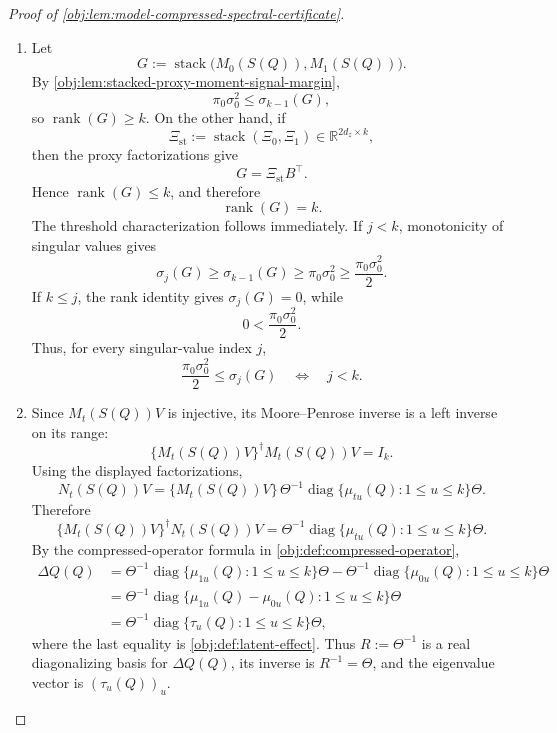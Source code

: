 \begin{proof}[Proof of \cref{obj:lem:model-compressed-spectral-certificate}]
\begin{enumerate}
\item
Let
\[
G:=\operatorname{stack}\bigl(M_0(S(Q)),M_1(S(Q))\bigr).
\]
By \cref{obj:lem:stacked-proxy-moment-signal-margin},
\[
\pi_0\sigma_0^2\le \sigma_{k-1}(G),
\]
so \(\operatorname{rank}(G)\ge k\).  On the other hand, if
\[
\Xi_{\mathrm{st}}:=\operatorname{stack}(\Xi_0,\Xi_1)\in\mathbb R^{2d_z\times k},
\]
then the proxy factorizations give
\[
G=\Xi_{\mathrm{st}}B^\top .
\]
Hence \(\operatorname{rank}(G)\le k\), and therefore
\[
\operatorname{rank}(G)=k .
\]
The threshold characterization follows immediately.  If \(j<k\), monotonicity of singular values gives
\[
\sigma_j(G)\ge\sigma_{k-1}(G)\ge\pi_0\sigma_0^2
\ge\frac{\pi_0\sigma_0^2}{2}.
\]
If \(k\le j\), the rank identity gives \(\sigma_j(G)=0\), while
\[
0<\frac{\pi_0\sigma_0^2}{2}.
\]
Thus, for every singular-value index \(j\),
\[
\frac{\pi_0\sigma_0^2}{2}\le \sigma_j(G)
\quad\Longleftrightarrow\quad
j<k .
\]

\item
Since \(M_t(S(Q))V\) is injective, its Moore--Penrose inverse is a left inverse on its range:
\[
\{M_t(S(Q))V\}^{\dagger}M_t(S(Q))V=I_k .
\]
Using the displayed factorizations,
\[
N_t(S(Q))V
=
\{M_t(S(Q))V\}\,
\Theta^{-1}\operatorname{diag}\{\mu_{tu}(Q):1\le u\le k\}\Theta .
\]
Therefore
\[
\{M_t(S(Q))V\}^{\dagger}N_t(S(Q))V
=
\Theta^{-1}\operatorname{diag}\{\mu_{tu}(Q):1\le u\le k\}\Theta .
\]
By the compressed-operator formula in \cref{obj:def:compressed-operator},
\[
\begin{aligned}
\Delta Q(Q)
&=
\Theta^{-1}\operatorname{diag}\{\mu_{1u}(Q):1\le u\le k\}\Theta
-
\Theta^{-1}\operatorname{diag}\{\mu_{0u}(Q):1\le u\le k\}\Theta  \\
&=
\Theta^{-1}\operatorname{diag}\{\mu_{1u}(Q)-\mu_{0u}(Q):1\le u\le k\}\Theta  \\
&=
\Theta^{-1}\operatorname{diag}\{\tau_u(Q):1\le u\le k\}\Theta ,
\end{aligned}
\]
where the last equality is \cref{obj:def:latent-effect}.  Thus \(R:=\Theta^{-1}\) is a real diagonalizing basis for \(\Delta Q(Q)\), its inverse is \(R^{-1}=\Theta\), and the eigenvalue vector is \((\tau_u(Q))_u\).


\end{enumerate}
\end{proof}
